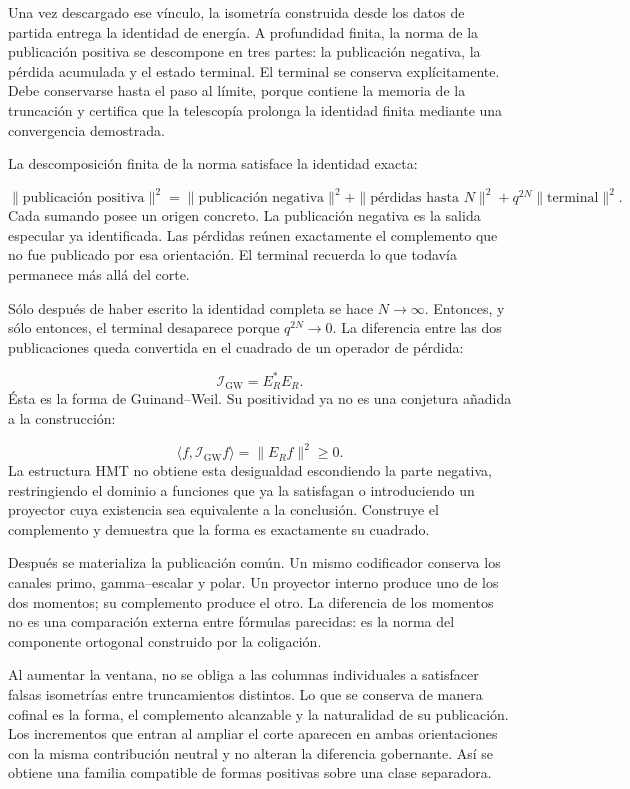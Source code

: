Una vez descargado ese vínculo, la isometría construida desde los datos de partida entrega la identidad de energía. A profundidad finita, la norma de la publicación positiva se descompone en tres partes: la publicación negativa, la pérdida acumulada y el estado terminal. El terminal se conserva explícitamente. Debe conservarse hasta el paso al límite, porque contiene la memoria de la truncación y certifica que la telescopía prolonga la identidad finita mediante una convergencia demostrada.\par
La descomposición finita de la norma satisface la identidad exacta:\par
\[
\|\text{publicación positiva}\|^2
=
\|\text{publicación negativa}\|^2
+
\|\text{pérdidas hasta }N\|^2
+
q^{2N}\|\text{terminal}\|^2.
\]
Cada sumando posee un origen concreto. La publicación negativa es la salida especular ya identificada. Las pérdidas reúnen exactamente el complemento que no fue publicado por esa orientación. El terminal recuerda lo que todavía permanece más allá del corte.\par
Sólo después de haber escrito la identidad completa se hace \(N\to\infty\). Entonces, y sólo entonces, el terminal desaparece porque \(q^{2N}\to0\). La diferencia entre las dos publicaciones queda convertida en el cuadrado de un operador de pérdida:\par
\[
\mathcal I_{\mathrm{GW}}
=
E_R^{*}E_R.
\]
Ésta es la forma de Guinand–Weil. Su positividad ya no es una conjetura añadida a la construcción:\par
\[
\langle f,\mathcal I_{\mathrm{GW}}f\rangle
=
\|E_Rf\|^2
\ge0.
\]
La estructura HMT no obtiene esta desigualdad escondiendo la parte negativa, restringiendo el dominio a funciones que ya la satisfagan o introduciendo un proyector cuya existencia sea equivalente a la conclusión. Construye el complemento y demuestra que la forma es exactamente su cuadrado.\par
Después se materializa la publicación común. Un mismo codificador conserva los canales primo, gamma–escalar y polar. Un proyector interno produce uno de los dos momentos; su complemento produce el otro. La diferencia de los momentos no es una comparación externa entre fórmulas parecidas: es la norma del componente ortogonal construido por la coligación.\par
Al aumentar la ventana, no se obliga a las columnas individuales a satisfacer falsas isometrías entre truncamientos distintos. Lo que se conserva de manera cofinal es la forma, el complemento alcanzable y la naturalidad de su publicación. Los incrementos que entran al ampliar el corte aparecen en ambas orientaciones con la misma contribución neutral y no alteran la diferencia gobernante. Así se obtiene una familia compatible de formas positivas sobre una clase separadora.\par
